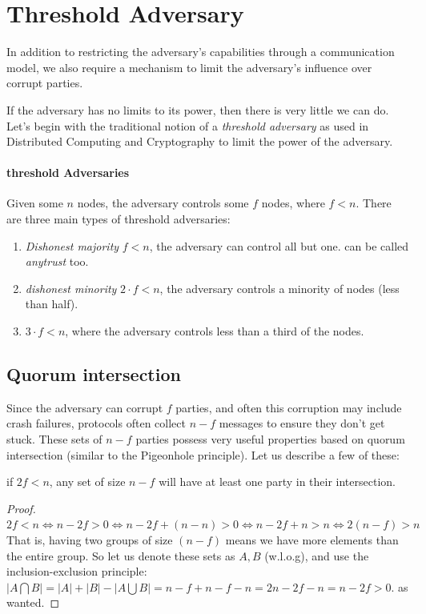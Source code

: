 \section{Threshold Adversary}
In addition to restricting the adversary's capabilities through a communication model,
 we also require a mechanism to limit the adversary's influence over corrupt parties.

If the adversary has no limits to its power, then there is very little we can do.
Let's begin with the traditional notion of a \emph{threshold adversary} as used in Distributed 
Computing and Cryptography to limit the power of the adversary.


\paragraph{threshold Adversaries}
    Given some $n$ nodes, the adversary controls some $f$ nodes, where $f<n$.
    There are three main types of threshold adversaries:
\begin{enumerate}
    \item \emph{Dishonest majority} $f<n$, the adversary can control all but one. can be called \emph{anytrust} too.
    \item \emph{dishonest minority} $2\cdot f<n$, the adversary controls a minority of nodes (less than half).
    \item $3\cdot f < n$, where the adversary controls less than a third of the nodes.
\end{enumerate}

\subsection{Quorum intersection}
Since the adversary can corrupt $f$ parties, and often this corruption may include crash failures,
 protocols often collect $n-f$ messages to ensure they don't get stuck.
  These sets of $n-f$ parties possess very useful properties based on quorum intersection
   (similar to the Pigeonhole principle).
   Let us describe a few of these:

\begin{thm}
    if $2f<n$, any set of size $n-f$  will have at least one party in their
    intersection.
\end{thm} 
 \begin{proof}
    $2f<n \iff n-2f>0 \iff n-2f +(n-n) >0 \iff n-2f+n>n \iff 2(n-f)>n$
    That is, having two groups of size $(n-f)$ means we have more elements than the entire group.
    So let us denote these sets as $A,B$ (w.l.o.g), and use the 
    inclusion-exclusion principle:
    $|A\bigcap B| = |A| + |B| - |A\bigcup B| = n-f + n-f - n = 2n - 2f - n = n - 2f > 0$.
    as wanted.
 \end{proof}

